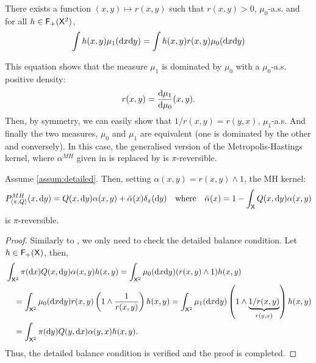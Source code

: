 \documentclass[english,graybox,envcountchap,envcountsame,sectrefs,shortlabels]{svmono}
\theoremstyle{style}
\newenvironment{hyp}[1]{
\begin{enumerate}[label=(\textbf{\sf #1}\arabic*),resume=hyp#1]\begin{sf}}
{\end{sf}\end{enumerate}}
\begin{document}
\begin{hyp}{B}
\item \label{assum:detailed}  There exists a function $(x,y)\mapsto r(x,y)$ such that $r(x,y)>0$, $\mu_0$-a.s. and for all $h\in \mathsf{F_{+}}(\mathsf{X}^2)$,
\begin{equation}
\label{eq:detailed}
\int h(x,y)\mu_1(\mathrm{d} x\mathrm{d} y)=\int h(x,y) r(x,y)\mu_0(\mathrm{d} x\mathrm{d} y)
\end{equation}
\end{hyp}


This equation shows that the measure $\mu_1$ is dominated by $\mu_0$ with a $\mu_0$-a.s. positive density: 
$$
r(x,y)=\frac{\mathrm{d} \mu_1}{\mathrm{d} \mu_0}(x,y).
$$ 
Then, by symmetry, we can easily show that $1/r(x,y)=r(y,x)$, $\mu_1$-a.s. And finally the two measures, $\mu_0$ and $\mu_1$ are equivalent (one is dominated by the other and conversely). In this case, the generalised version of the Metropolis-Hastings kernel, where $\alpha^{MH}$ given in  is replaced by  is $\pi$-reversible.

\begin{lemma} \label{lem:generalMH}
Assume \ref{assum:detailed}. Then, setting $\alpha(x,y)=r(x,y) \wedge 1$, the MH kernel:
$$
P_{\langle\pi,Q\rangle}^{MH}(x,\mathrm{d} y)=Q(x,\mathrm{d} y)\alpha(x,y)+\bar{\alpha}(x)\delta_{x}(\mathrm{d} y) \quad \mbox{where} \quad \bar \alpha(x)=1-\int_{\mathsf{X}} Q(x,\mathrm{d} y)\alpha(x,y)
$$
is $\pi$-reversible.
\end{lemma}


\begin{proof}
Similarly to , we only need to check the detailed balance condition. Let $h\in\mathsf{F_{+}}(\mathsf{X})$, then,
\begin{align*}
&\int_{\mathsf{X}^2} \pi(\mathrm{d} x) Q(x,\mathrm{d} y) \alpha(x,y) h(x,y)=\int_{\mathsf{X}^2} \mu_0(\mathrm{d} x\mathrm{d} y) (r(x,y)\wedge 1)  h(x,y)
\\
&\quad =\int_{\mathsf{X}^2} \mu_0(\mathrm{d} x\mathrm{d} y) r(x,y)\left(1\wedge \frac{1}{r(x,y)}\right) h(x,y)=\int_{\mathsf{X}^2} \mu_1(\mathrm{d} x\mathrm{d} y) \left(1\wedge \underbrace{1/r(x,y)}_{r(y,x)}\right) h(x,y)\\
&\quad =\int_{\mathsf{X}^2} \pi(\mathrm{d} y) Q(y,\mathrm{d} x) \alpha(y,x) h(x,y).
\end{align*}
Thus, the detailed balance condition is verified and the proof is completed.
\end{proof}
\end{document}
